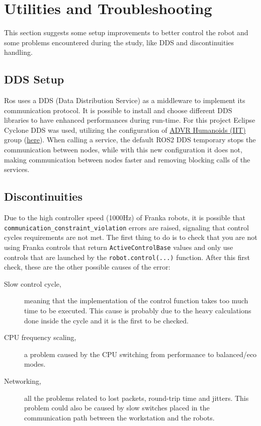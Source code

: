 \documentclass{article}
\begin{document}
\section{Utilities and Troubleshooting}
This section suggests some setup improvements to better control the robot and some problems encountered during the study, like DDS and discontinuities handling.

\subsection{DDS Setup}
Ros uses a DDS (Data Distribution Service) as a middleware to implement its communication protocol. It is possible to install and choose different DDS libraries to have enhanced performances during run-time. For this project Eclipse Cyclone DDS was used, utilizing the configuration of \href{https://github.com/ADVRHumanoids}{ADVR Humanoids (IIT)} group (\href{https://github.com/ADVRHumanoids/ros2_config}{here}). When calling a service, the default ROS2 DDS temporary stops the communication between nodes, while with this new configuration it does not, making communication between nodes faster and removing blocking calls of the services.

\subsection{Discontinuities}
Due to the high controller speed (1000Hz) of Franka robots, it is possible that \texttt{communication\_constraint\_violation} errors are raised, signaling that control cycles requirements are not met. 
The first thing to do is to check that you are not using Franka controls that return \texttt{ActiveControlBase} values and only use controls that are launched by the \texttt{robot.control(...)} function.
After this first check, these are the other possible causes of the error:
\begin{description}
    \item[Slow control cycle,] meaning that the implementation of the control function takes too much time to be executed. This cause is probably due to the heavy calculations done inside the cycle and it is the first to be checked.
    \item[CPU frequency scaling,] a problem caused by the CPU switching from performance to balanced/eco modes.
    \item[Networking,] all the problems related to lost packets, round-trip time and jitters. This problem could also be caused by slow switches placed in the communication path between the workstation and the robots.
\end{description}
\end{document}
